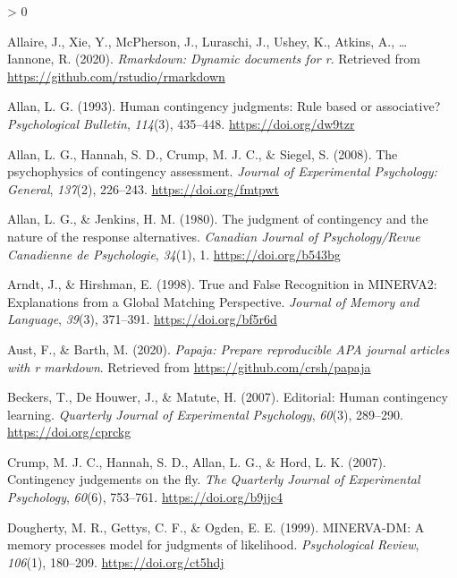 \documentclass[
  english,
  man,floatsintext]{apa6}
\newlength{\cslhangindent}
\newenvironment{CSLReferences}[2] %
 {%
  \setlength{\parindent}{0pt}
  \ifodd #1 \everypar{\setlength{\hangindent}{\cslhangindent}}\ignorespaces\fi
  \ifnum #2 > 0
  \setlength{\parskip}{#2\baselineskip}
  \fi
 }%
 {}
\begin{document}
\hypertarget{refs}{}
\begin{CSLReferences}{1}{0}
\leavevmode\hypertarget{ref-R-rmarkdown}{}%
Allaire, J., Xie, Y., McPherson, J., Luraschi, J., Ushey, K., Atkins, A., \ldots{} Iannone, R. (2020). \emph{Rmarkdown: Dynamic documents for r}. Retrieved from \url{https://github.com/rstudio/rmarkdown}

\leavevmode\hypertarget{ref-allanHumanContingencyJudgments1993}{}%
Allan, L. G. (1993). Human contingency judgments: {Rule} based or associative? \emph{Psychological Bulletin}, \emph{114}(3), 435--448. \url{https://doi.org/dw9tzr}

\leavevmode\hypertarget{ref-allanPsychophysicsContingencyAssessment2008}{}%
Allan, L. G., Hannah, S. D., Crump, M. J. C., \& Siegel, S. (2008). The psychophysics of contingency assessment. \emph{Journal of Experimental Psychology: General}, \emph{137}(2), 226--243. \url{https://doi.org/fmtpwt}

\leavevmode\hypertarget{ref-allanJudgmentContingencyNature1980}{}%
Allan, L. G., \& Jenkins, H. M. (1980). The judgment of contingency and the nature of the response alternatives. \emph{Canadian Journal of Psychology/Revue Canadienne de Psychologie}, \emph{34}(1), 1. \url{https://doi.org/b543bg}

\leavevmode\hypertarget{ref-arndtTrueFalseRecognition1998}{}%
Arndt, J., \& Hirshman, E. (1998). True and {False Recognition} in {MINERVA2}: {Explanations} from a {Global Matching Perspective}. \emph{Journal of Memory and Language}, \emph{39}(3), 371--391. \url{https://doi.org/bf5r6d}

\leavevmode\hypertarget{ref-R-papaja}{}%
Aust, F., \& Barth, M. (2020). \emph{Papaja: Prepare reproducible APA journal articles with r markdown}. Retrieved from \url{https://github.com/crsh/papaja}

\leavevmode\hypertarget{ref-beckersEditorialHumanContingency2007}{}%
Beckers, T., De Houwer, J., \& Matute, H. (2007). Editorial: {Human} contingency learning. \emph{Quarterly Journal of Experimental Psychology}, \emph{60}(3), 289--290. \url{https://doi.org/cprckg}

\leavevmode\hypertarget{ref-crumpContingencyJudgementsFly2007}{}%
Crump, M. J. C., Hannah, S. D., Allan, L. G., \& Hord, L. K. (2007). Contingency judgements on the fly. \emph{The Quarterly Journal of Experimental Psychology}, \emph{60}(6), 753--761. \url{https://doi.org/b9jjc4}

\leavevmode\hypertarget{ref-doughertyMINERVADMMemoryProcesses1999}{}%
Dougherty, M. R., Gettys, C. F., \& Ogden, E. E. (1999). {MINERVA}-{DM}: {A} memory processes model for judgments of likelihood. \emph{Psychological Review}, \emph{106}(1), 180--209. \url{https://doi.org/ct5hdj}


\end{CSLReferences}
\end{document}
